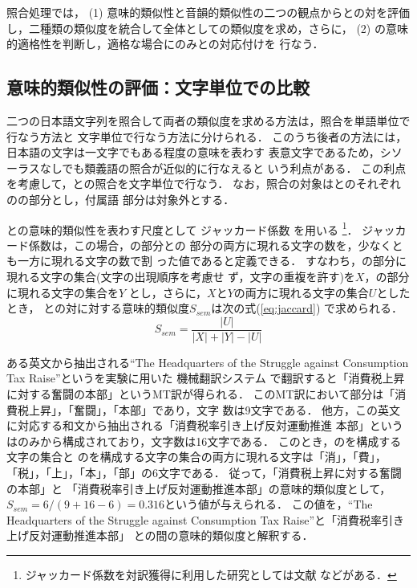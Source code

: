 照合処理では，
(1) 意味的類似性と音韻的類似性の二つの観点から{\MTNP}と{\JNP}の対を評価
し，二種類の類似度を統合して全体としての類似度を求め，さらに，
(2) {\CPNP}の意味的適格性を判断し，適格な場合にのみ{\JNP}との対応付けを
行なう． 


\subsection{意味的類似性の評価：文字単位での比較}
\label{sec:alignment:align:sem}

二つの日本語文字列を照合して両者の類似度を求める方法は，照合を単語単位で
行なう方法\cite{Sumita91,TanakaH99}と 
文字単位で行なう方法\cite{Sato92}に分けられる．
このうち後者の方法には，日本語の文字は一文字でもある程度の意味を表わす
表意文字であるため，シソーラスなしでも類義語の照合が近似的に行なえると
いう利点がある\cite{Sato92}．  
この利点を考慮して，{\MTNP}と{\JNP}の照合を文字単位で行なう． 
なお，照合の対象は{\MTNP}と{\JNP}のそれぞれの{\N}の部分とし，付属語
部分は対象外とする．

{\MTNP}と{\JNP}の意味的類似性を表わす尺度として
ジャッカード係数\cite{Romesburg92}
を用いる
\footnote{ジャッカード係数を対訳獲得に利用した研究としては文献
\cite{Kaji01}などがある．}．
ジャッカード係数は，この場合，{\MTNP}の{\N}部分と{\JNP}の
{\N}部分の両方に現れる文字の数を，少なくとも一方に現れる文字の数で割
った値であると定義できる．
すなわち，{\MTNP}の{\N}部分に現れる文字の集合(文字の出現順序を考慮せ
ず，文字の重複を許す)を$X$，{\JNP}の{\N}部分に現れる文字の集合を$Y$
とし，さらに，$X$と$Y$の両方に現れる文字の集合$U$としたとき，
{\MTNP}と{\JNP}の対に対する意味的類似度$S_{sem}$は次の式(\ref{eq:jaccard})
で求められる．
\begin{equation}
S_{sem} = \frac{|U|}{|X| + |Y| - |U|}
\label{eq:jaccard}
\end{equation}

ある英文から抽出される``The Headquarters of the Struggle 
against Consumption Tax Raise''という{\CPNP}を実験に用いた
機械翻訳システム
で翻訳すると「消費税上昇に対する奮闘の本部」というMT訳が得られる．
このMT訳において{\N}部分は「消費税上昇」，「奮闘」，「本部」であり，文字
数は9文字である．
他方，この英文に対応する和文から抽出される「消費税率引き上げ反対運動推進
本部」という{\JNP}は{\N}のみから構成されており，文字数は16文字である．
このとき，{\MTNP}の{\N}を構成する文字の集合と
{\JNP}の{\N}を構成する文字の集合の両方に現れる文字は「消」，「費」，
「税」，「上」，「本」，「部」の6文字である．
従って，{\MTNP}「消費税上昇に対する奮闘の本部」と
{\JNP}「消費税率引き上げ反対運動推進本部」の意味的類似度として，
$S_{sem} = 6/(9+16-6) = 0.316$という値が与えられる．
この値を，{\CPNP}``The Headquarters of the Struggle against 
Consumption Tax Raise''と{\JNP}「消費税率引き上げ反対運動推進本部」
との間の意味的類似度と解釈する．


